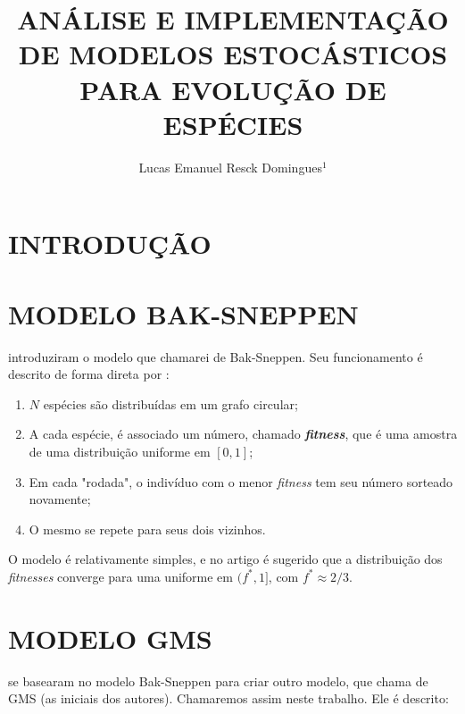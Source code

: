 \documentclass[10pt,brazil,english]{article}
\title{ANÁLISE E IMPLEMENTAÇÃO DE MODELOS ESTOCÁSTICOS PARA EVOLUÇÃO DE ESPÉCIES}
\author{Lucas Emanuel Resck Domingues$^{1}$}
\begin{document}
    \pagestyle{fancy} %
    
    \maketitle
    \newpage

    \newtheorem{theorem}{Teorema}
    
    \section{\uppercase{Introdução}}
    
    \section{\uppercase{Modelo Bak-Sneppen}}

         introduziram o modelo que chamarei de Bak-Sneppen.
        Seu funcionamento é descrito de forma direta por :

        \renewcommand{\theenumi}{\roman{enumi}} 
        \begin{enumerate}
            \item $N$ espécies são distribuídas em um grafo circular;
            \item A cada espécie, é associado um número, chamado \textit{\textbf{fitness}}, que é uma amostra de uma distribuição uniforme em $[0, 1]$;
            \item Em cada "rodada", o indivíduo com o menor \textit{fitness} tem seu número sorteado novamente;
            \item O mesmo se repete para seus dois vizinhos.
        \end{enumerate}

        O modelo é relativamente simples, e no artigo é sugerido que a distribuição dos \textit{fitnesses} converge para uma uniforme em $(f^*, 1]$, com $f^* \approx 2/3$.

    \section{\uppercase{Modelo GMS}}

         se basearam no modelo Bak-Sneppen para criar outro modelo, que  chama de GMS (as iniciais dos autores). Chamaremos assim neste trabalho. Ele é descrito:
\end{document}
